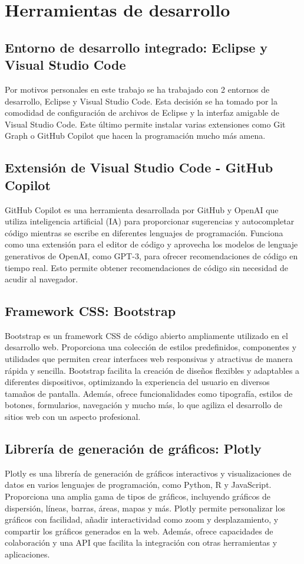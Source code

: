 \section{Herramientas de desarrollo}
\subsection{Entorno de desarrollo integrado: Eclipse y Visual Studio Code}
Por motivos personales en este trabajo se ha trabajado con 2 entornos de desarrollo, Eclipse y Visual Studio Code. Esta decisión se ha tomado por la comodidad de configuración de archivos de Eclipse y la interfaz amigable de Visual Studio Code. Este último permite instalar varias extensiones como Git Graph o GitHub Copilot que hacen la programación mucho más amena.
\subsection{Extensión de Visual Studio Code - GitHub Copilot}
GitHub Copilot es una herramienta desarrollada por GitHub y OpenAI que utiliza inteligencia artificial (IA) para proporcionar sugerencias y autocompletar código mientras se escribe en diferentes lenguajes de programación. Funciona como una extensión para el editor de código y aprovecha los modelos de lenguaje generativos de OpenAI, como GPT-3, para ofrecer recomendaciones de código en tiempo real.
Esto permite obtener recomendaciones de código sin necesidad de acudir al navegador.
\subsection{Framework CSS: Bootstrap}
Bootstrap es un framework CSS de código abierto ampliamente utilizado en el desarrollo web. Proporciona una colección de estilos predefinidos, componentes y utilidades que permiten crear interfaces web responsivas y atractivas de manera rápida y sencilla. Bootstrap facilita la creación de diseños flexibles y adaptables a diferentes dispositivos, optimizando la experiencia del usuario en diversos tamaños de pantalla. Además, ofrece funcionalidades como tipografía, estilos de botones, formularios, navegación y mucho más, lo que agiliza el desarrollo de sitios web con un aspecto profesional.
\subsection{Librería de generación de gráficos: Plotly}
Plotly es una librería de generación de gráficos interactivos y visualizaciones de datos en varios lenguajes de programación, como Python, R y JavaScript. Proporciona una amplia gama de tipos de gráficos, incluyendo gráficos de dispersión, líneas, barras, áreas, mapas y más. Plotly permite personalizar los gráficos con facilidad, añadir interactividad como zoom y desplazamiento, y compartir los gráficos generados en la web. Además, ofrece capacidades de colaboración y una API que facilita la integración con otras herramientas y aplicaciones.


